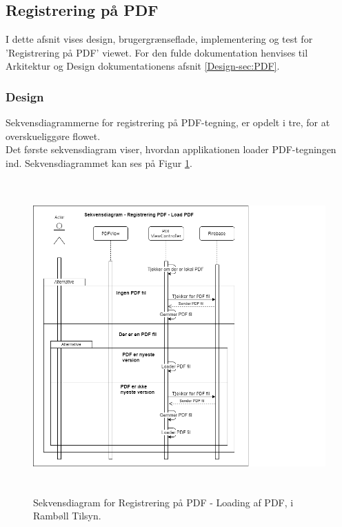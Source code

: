 \subsection{Registrering på PDF}
I dette afsnit vises design, brugergrænseflade, implementering og test for 'Registrering på PDF' viewet. For den fulde dokumentation henvises til Arkitektur og Design dokumentationens afsnit \ref{Design-sec:PDF}.
\subsubsection{Design}
Sekvensdiagrammerne for registrering på PDF-tegning, er opdelt i tre, for at overskueliggøre flowet. \\
Det første sekvensdiagram viser, hvordan applikationen loader PDF-tegningen ind. Sekvensdiagrammet kan ses på Figur \ref{fig:LoadPDFSekvensDiagram}.
\begin{figure}[H] %
	\centering
	\includegraphics[height=12cm, width=15cm]{Design/Applikation/RegistrePDF/LoadPDFSekvensDiagram}
	\caption{Sekvensdiagram for Registrering på PDF - Loading af PDF, i Rambøll Tilsyn.}
	\label{fig:LoadPDFSekvensDiagram}
\end{figure}

\clearpage

